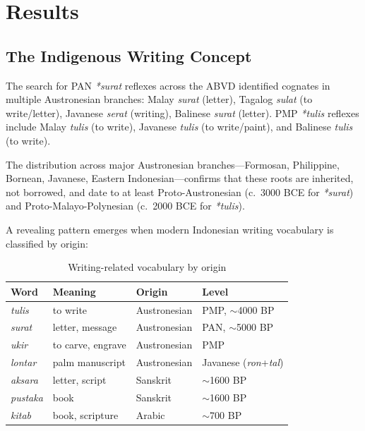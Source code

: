 \documentclass[12pt,a4paper]{article}
\begin{document}
\section{Results}

\subsection{The Indigenous Writing Concept}

The search for PAN \textit{*surat} reflexes across the ABVD identified cognates in multiple Austronesian branches: Malay \textit{surat} (letter), Tagalog \textit{sulat} (to write/letter), Javanese \textit{serat} (writing), Balinese \textit{surat} (letter). PMP \textit{*tulis} reflexes include Malay \textit{tulis} (to write), Javanese \textit{tulis} (to write/paint), and Balinese \textit{tulis} (to write).

The distribution across major Austronesian branches---Formosan, Philippine, Bornean, Javanese, Eastern Indonesian---confirms that these roots are inherited, not borrowed, and date to at least Proto-Austronesian (c.\ 3000 BCE for \textit{*surat}) and Proto-Malayo-Polynesian (c.\ 2000 BCE for \textit{*tulis}).

A revealing pattern emerges when modern Indonesian writing vocabulary is classified by origin:

\begin{table}[h]
\centering
\caption{Writing-related vocabulary by origin}
\begin{tabular}{llll}
\toprule
Word & Meaning & Origin & Level \\
\midrule
\textit{tulis} & to write & Austronesian & PMP, $\sim$4000 BP \\
\textit{surat} & letter, message & Austronesian & PAN, $\sim$5000 BP \\
\textit{ukir} & to carve, engrave & Austronesian & PMP \\
\textit{lontar} & palm manuscript & Austronesian & Javanese (\textit{ron}+\textit{tal}) \\
\textit{aksara} & letter, script & Sanskrit & $\sim$1600 BP \\
\textit{pustaka} & book & Sanskrit & $\sim$1600 BP \\
\textit{kitab} & book, scripture & Arabic & $\sim$700 BP \\
\bottomrule
\end{tabular}
\end{table}
\end{document}
